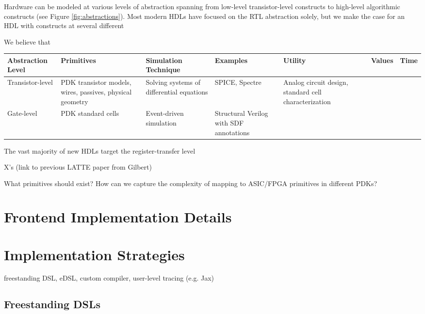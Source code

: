 \documentclass[sigplan,review,nonacm,9pt]{acmart}
\begin{document}
Hardware can be modeled at various levels of abstraction spanning from low-level transistor-level constructs to high-level algorithmic constructs (see Figure \ref{fig:abstractions}).
Most modern HDLs have focused on the RTL abstraction solely, but we make the case for an HDL with constructs at several different

We believe that 



\begin{figure*}
\small
\begin{tabular}{p{3cm}p{3cm}p{3cm}p{3cm}p{3cm}p{3cm}p{3cm}}\toprule
\textbf{Abstraction Level} & Primitives & Simulation Technique & Examples & Utility & Values & Time \\\midrule
Transistor-level & PDK transistor models, wires, passives, physical geometry & Solving systems of differential equations & SPICE, Spectre & Analog circuit design, standard cell characterization &  & \\\midrule
Gate-level & PDK standard cells & Event-driven simulation & Structural Verilog with SDF annotations & & & \\
\bottomrule
\end{tabular}
\caption{Overview of different abstraction levels for describing hardware designs and }
\label{fig:abstractions}
\end{figure*}

The vast majority of new HDLs target the register-transfer level

X's (link to previous LATTE paper from Gilbert)


What primitives should exist? How can we capture the complexity of mapping to ASIC/FPGA primitives in different PDKs?


\section{Frontend Implementation Details}

\section{Implementation Strategies}

freestanding DSL, eDSL, custom compiler, user-level tracing (e.g. Jax)

\subsection{Freestanding DSLs}
\end{document}
